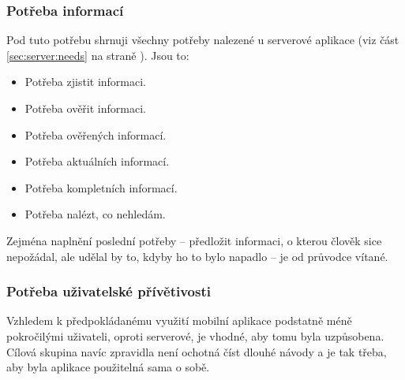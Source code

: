 \subsubsection{Potřeba informací}
Pod tuto potřebu shrnuji všechny potřeby nalezené u serverové aplikace (viz část \ref{sec:server:needs} na straně \pageref{sec:server:needs}). Jsou to:
\begin{itemize}
 \item Potřeba zjistit informaci.
 \item Potřeba ověřit informaci.
 \item Potřeba ověřených informací.
 \item Potřeba aktuálních informací.
 \item Potřeba kompletních informací.
 \item Potřeba nalézt, co nehledám.
\end{itemize}
Zejména naplnění poslední potřeby -- předložit informaci, o kterou člověk sice nepožádal, ale udělal by to, kdyby ho to bylo napadlo -- je od průvodce vítané.

\subsubsection{Potřeba uživatelské přívětivosti}
Vzhledem k předpokládanému využití mobilní aplikace podstatně méně pokročilými uživateli, oproti serverové, je vhodné, aby tomu byla uzpůsobena. Cílová skupina navíc zpravidla není ochotná číst dlouhé návody a je tak třeba, aby byla aplikace použitelná sama o sobě.

